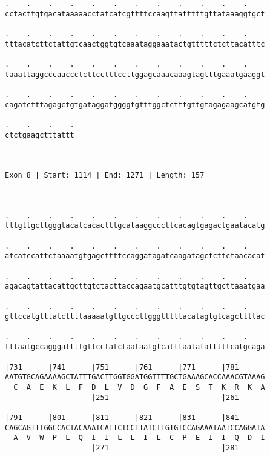 \documentclass{article}
\begin{document}
\begin{Verbatim}
.    .    .    .    .    .    .    .    .    .    .    .    
cctacttgtgacataaaaacctatcatcgttttccaagttatttttgttataaaggtgct
                                                            
.    .    .    .    .    .    .    .    .    .    .    .    
tttacatcttctattgtcaactggtgtcaaataggaaatactgtttttctcttacatttc
                                                            
.    .    .    .    .    .    .    .    .    .    .    .    
taaattaggcccaaccctcttcctttccttggagcaaacaaagtagtttgaaatgaaggt
                                                            
.    .    .    .    .    .    .    .    .    .    .    .    
cagatctttagagctgtgataggatggggtgtttggctctttgttgtagagaagcatgtg
                                                            
.    .    .    .
ctctgaagctttattt
                
                
 
Exon 8 | Start: 1114 | End: 1271 | Length: 157



.    .    .    .    .    .    .    .    .    .    .    .    
tttgttgcttgggtacatcacactttgcataaggcccttcacagtgagactgaatacatg
                                                            
.    .    .    .    .    .    .    .    .    .    .    .    
atcatccattctaaaatgtgagcttttccaggatagatcaagatagctcttctaacacat
                                                            
.    .    .    .    .    .    .    .    .    .    .    .    
agacagtattacattgcttgtctacttaccagaatgcatttgtgtagttgcttaaatgaa
                                                            
.    .    .    .    .    .    .    .    .    .    .    .    
gttccatgtttatcttttaaaaatgttgcccttgggtttttacatagtgtcagcttttac
                                                            
.    .    .    .    .    .    .    .    .    .    .    .    
tttaatgccagggattttgttcctatctaataatgtcatttaatatatttttcatgcaga
                                                            
|731      |741      |751      |761      |771      |781      
AATGTGCAGAAAAGCTATTTGACTTGGTGGATGGTTTTGCTGAAAGCACCAAACGTAAAG
  C  A  E  K  L  F  D  L  V  D  G  F  A  E  S  T  K  R  K  A
                    |251                          |261      
  
|791      |801      |811      |821      |831      |841      
CAGCAGTTTGGCCACTACAAATCATTCTCCTTATCTTGTGTCCAGAAATAATCCAGGATA
  A  V  W  P  L  Q  I  I  L  L  I  L  C  P  E  I  I  Q  D  I
                    |271                          |281      
  

\end{Verbatim}
\end{document}
